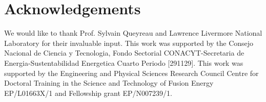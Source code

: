 \documentclass[11pt]{iopart}
\begin{document}
\section{Acknowledgements}

We would like to thank Prof. Sylvain Queyreau and Lawrence Livermore National Laboratory for their invaluable input. This work was supported by the Consejo Nacional de Ciencia y Tecnologia, Fondo Sectorial CONACYT-Secretaria de Energia-Sustentabilidad Energetica Cuarto Periodo [291129]. This work was supported by the Engineering and Physical Sciences Research Council Centre for Doctoral Training in the Science and Technology of Fusion Energy EP/L01663X/1 and Fellowship grant EP/N007239/1.

\newcommand{\newblock}{}








\end{document}
